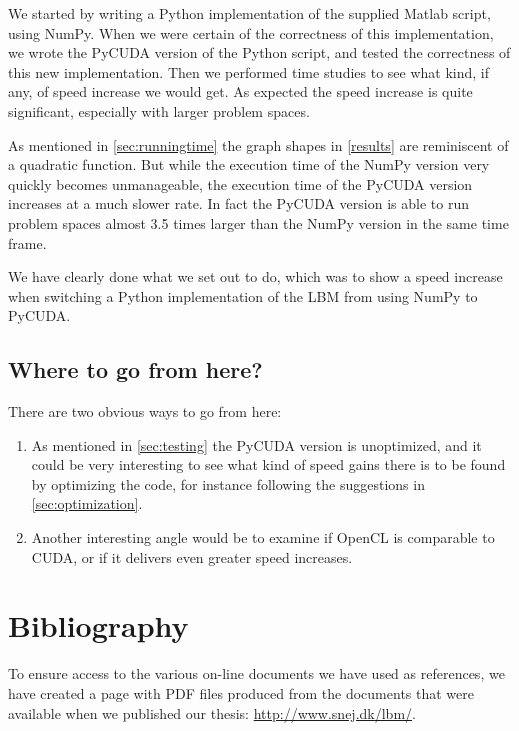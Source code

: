 We started by writing a Python implementation of the supplied Matlab script, using NumPy. When we were certain of the correctness of this implementation, we wrote the PyCUDA version of the Python script, and tested the correctness of this new implementation. Then we performed time studies to see what kind, if any, of speed increase we would get. As expected the speed increase is quite significant, especially with larger problem spaces.

As mentioned in \autoref{sec:runningtime} the graph shapes in \autoref{results} are reminiscent of a quadratic function. But while the execution time of the NumPy version very quickly becomes unmanageable, the execution time of the PyCUDA version increases at a much slower rate. In fact the PyCUDA version is able to run problem spaces almost 3.5 times larger than the NumPy version in the same time frame.

We have clearly done what we set out to do, which was to show a speed increase when switching a Python implementation of the LBM from using NumPy to PyCUDA.

\subsection{Where to go from here?}

There are two obvious ways to go from here:

\begin{enumerate}
\item As mentioned in \autoref{sec:testing} the PyCUDA version is unoptimized, and it could be very interesting to see what kind of speed gains there is to be found by optimizing the code, for instance following the suggestions in \autoref{sec:optimization}.
\item Another interesting angle would be to examine if OpenCL is comparable to CUDA, or if it delivers even greater speed increases.
\end{enumerate}

\newpage


\newpage
\section{Bibliography}

To ensure access to the various on-line documents we have used as references, we have created a page with PDF files produced from the documents that were available when we published our thesis: \url{http://www.snej.dk/lbm/}.






